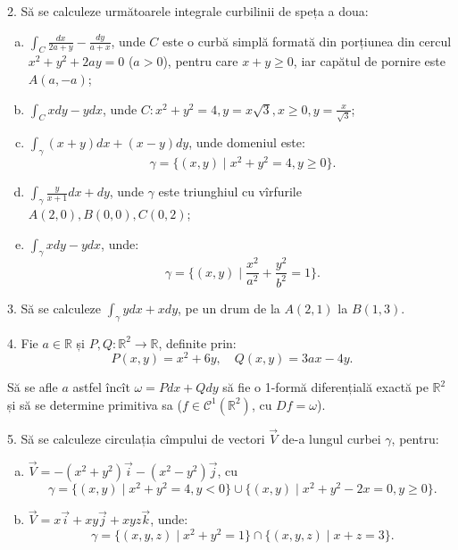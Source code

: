 \documentclass[11pt,a4paper]{article}
\newcommand\kal{\mathcal}
\newcommand\RR{\mathbb{R}}
\theoremstyle{dotless}
\theoremstyle{dotlessdr}
\begin{document}
\vspace{1cm}

2. Să se calculeze următoarele integrale curbilinii de speța a doua:
\begin{enumerate}[(a)]
\item $\int_C \frac{dx}{2a + y} - \frac{dy}{a + x}$, unde $C$ este o curbă
  simplă formată din porțiunea din cercul $x^2 + y^2 + 2ay = 0$ ($a > 0$),
  pentru care $x + y \geq 0$, iar capătul de pornire este $A(a, -a)$;
\item $\int_C xdy - ydx$, unde $C: x^2 + y^2 = 4, y = x \sqrt{3}, x \geq 0, %
  y = \frac{x}{\sqrt{3}}$;
\item $\int_\gamma (x + y) dx + (x - y) dy$, unde domeniul este:
  \[
    \gamma = \{(x, y) \mid x^2 + y^2 = 4, y \geq 0\}.
  \]
\item $\int_\gamma \frac{y}{x + 1} dx + dy$, unde $\gamma$ este triunghiul cu
  vîrfurile $A(2, 0), B(0, 0), C(0, 2)$;
\item $\int_\gamma xdy - ydx$, unde:
  \[
    \gamma = \{(x, y) \mid \frac{x^2}{a^2} + \frac{y^2}{b^2} = 1 \}.
  \]
\end{enumerate}

\vspace{1cm}

3. Să se calculeze $\int_\gamma ydx + xdy$, pe un drum de la $A(2, 1)$
la $B(1, 3)$.

\vspace{1cm}

4. Fie $a \in \RR$ și $P, Q : \RR^2 \to \RR$, definite prin:
\[
  P(x, y) = x^2 + 6y, \quad Q(x, y) = 3ax - 4y.
\]

Să se afle $a$ astfel încît $\omega = Pdx + Qdy$ să fie o 1-formă diferențială
exactă pe $\RR^2$ și să se determine primitiva sa ($f \in \kal{C}^1(\RR^2)$, cu
$Df = \omega$).

\vspace{1cm}

5. Să se calculeze circulația cîmpului de vectori $\vec{V}$ de-a lungul curbei
$\gamma$, pentru:
\begin{enumerate}[(a)]
\item $\vec{V} = -(x^2 + y^2) \vec{i} - (x^2 - y^2) \vec{j}$, cu
  \[
    \gamma = \{(x, y) \mid x^2 + y^2 = 4, y < 0 \} \cup %
    \{(x, y) \mid x^2 + y^2 - 2x = 0, y \geq 0 \}.
  \]
\item $\vec{V} = x\vec{i} + xy \vec{j} + xyz \vec{k}$, unde:
  \[
    \gamma = \{(x, y, z) \mid x^2 + y^2 = 1 \} \cap
    \{(x, y, z) \mid x + z = 3 \}.
  \]
\end{enumerate}
\end{document}
